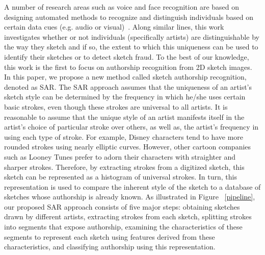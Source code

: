 A number of research areas such as voice and face recognition are based on designing automated methods to recognize and distinguish individuals based on certain data cues (e.g. audio or visual)~\cite{tolba2006face}. Along similar lines, this work investigates whether or not individuals (specifically artists) are distinguishable by the way they sketch and if so, the extent to which this uniqueness can be used to identify their sketches or to detect sketch fraud. To the best of our knowledge, this work is the first to focus on authorship recognition from 2D sketch images. In this paper, we propose a new method called sketch authorship recognition, denoted as SAR. The SAR approach assumes that the uniqueness of an artist's sketch style can be determined by the frequency in which he/she uses certain basic strokes, even though these strokes are universal to all artists. It is reasonable to assume that the unique style of an artist manifests itself in the artist's choice of particular stroke over others, as well as, the artist's frequency in using each type of stroke. For example, Disney characters tend to have more rounded strokes using nearly elliptic curves. However, other cartoon companies such as Looney Tunes prefer to adorn their characters with straighter and sharper strokes. Therefore, by extracting strokes from a digitized sketch, this sketch can be represented as a histogram of universal strokes. In turn, this representation is used to compare the inherent style of the sketch to a database of sketches whose authorship is already known. As illustrated in Figure ~\ref{pipeline}, our proposed SAR approach consists of five major steps: obtaining sketches drawn by different artists, extracting strokes from each sketch, splitting strokes into segments that expose authorship, examining the characteristics of these segments to represent each sketch using features derived from these characteristics, and classifying authorship using this representation.


